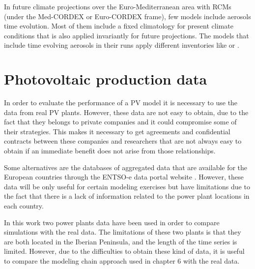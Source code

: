 In future climate projections over the Euro-Mediterranean area with RCMs (under the Med-CORDEX or Euro-CORDEX frame), few models include aerosols time evolution. Most of them include a fixed climatology for present climate conditions that is also applied invariantly for future projections. The models that include time evolving aerosols in their runs apply different inventories like \cite*{Szopa2013} or \cite*{Lamarque2010}.


\section{Photovoltaic production data}

In order to evaluate the performance of a PV model it is necessary to use the data from real PV plants. However, these data are not easy to obtain, due to the fact that they belongs to private companies and it could compromise some of their strategies. This makes it necessary to get agreements and confidential contracts between these companies and researchers that are not always easy to obtain if an immediate benefit does not arise from those relationships.

Some alternatives are the databases of aggregated data that are available for the European countries through the ENTSO-e data portal website \cite*{Hirth2018}. However, these data will be only useful for certain modeling exercises but have limitations due to the fact that there is a lack of information related to the power plant locations in each country.

In this work two power plants data have been used in order to compare simulations with the real data. The limitations of these two plants is that they are both located in the Iberian Peninsula, and the length of the time series is limited. However, due to the difficulties to obtain these kind of data, it is useful to compare the modeling chain approach used in chapter 6 with the real data.

\newpage

